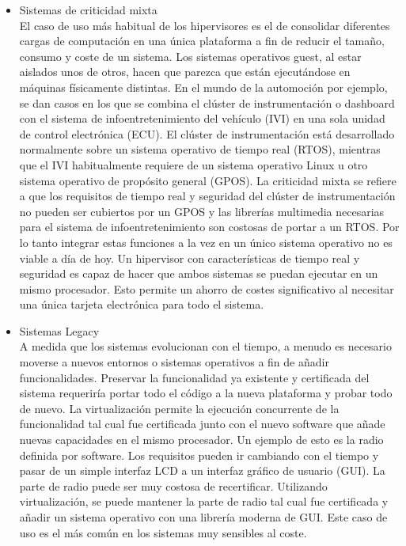 \begin{itemize}
	\item Sistemas de criticidad mixta\\
	El caso de uso más habitual de los hipervisores es el de consolidar diferentes cargas de computación en una única
	plataforma a fin de reducir el tamaño, consumo y coste de un sistema. Los sistemas operativos guest, al estar aislados unos de otros, hacen que parezca que están ejecutándose en máquinas físicamente distintas. En el mundo de la automoción por ejemplo,
	se dan casos en los que se combina el clúster de instrumentación o dashboard con el sistema de infoentretenimiento del vehículo (\acrshort{IVI}) en una sola unidad de control electrónica (ECU). El clúster de instrumentación está desarrollado normalmente sobre un sistema operativo de tiempo real (\acrshort{RTOS}), mientras que el \acrshort{IVI} habitualmente requiere de un sistema operativo Linux u otro sistema operativo de propósito general (\acrshort{GPOS}). La criticidad mixta se refiere a que los requisitos de tiempo real y seguridad del clúster de instrumentación no pueden ser cubiertos por un \acrshort{GPOS} y las librerías multimedia necesarias para el sistema de infoentretenimiento son costosas de portar a un \acrshort{RTOS}. Por lo tanto integrar estas funciones a la vez en un único sistema operativo no es viable a día de hoy. Un hipervisor con características de tiempo real y seguridad es capaz de hacer que ambos sistemas se puedan ejecutar en un mismo procesador. Esto permite un ahorro de costes significativo al necesitar una única tarjeta electrónica para todo el sistema.
	\item Sistemas Legacy\\
	A medida que los sistemas evolucionan con el tiempo, a menudo es necesario moverse a nuevos entornos o sistemas operativos a fin de añadir funcionalidades. Preservar la funcionalidad ya existente y certificada del sistema requeriría portar todo el código a la nueva plataforma y probar todo de nuevo. La virtualización permite la ejecución concurrente de la funcionalidad tal cual fue certificada junto con el nuevo software que añade nuevas capacidades en el mismo procesador. Un ejemplo de esto es la radio definida por software. Los requisitos pueden ir cambiando con el tiempo y pasar de un simple interfaz \acrshort{LCD} a un interfaz gráfico de usuario (\acrshort{GUI}). La parte de radio puede ser muy costosa de recertificar. Utilizando virtualización, se puede mantener la parte de radio tal cual fue certificada y añadir un sistema operativo con una librería moderna de \acrshort{GUI}.
	Este caso de uso es el más común en los sistemas muy sensibles al coste.\\[1cm]
\end{itemize}
